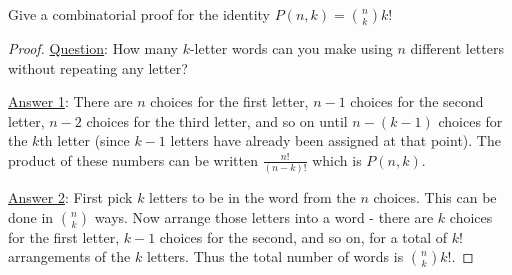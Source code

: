 \begin{questions}
\begin{answer}
	\end{answer}
	
	
	
\question Give a combinatorial proof for the identity $P(n,k) = {n \choose k}k!$
	
	\begin{answer}
		\begin{proof}
         \underline{Question}: How many $k$-letter words can you make using $n$ different letters without repeating any letter?
         
         \underline{Answer 1}: There are $n$ choices for the first letter, $n-1$ choices for the second letter, $n-2$ choices for the third letter, and so on until $n - (k-1)$ choices for the $k$th letter (since $k-1$ letters have already been assigned at that point).  The product of these numbers can be written $\frac{n!}{(n-k)!}$ which is $P(n,k)$.
         
         \underline{Answer 2}: First pick $k$ letters to be in the word from the $n$ choices.  This can be done in ${n \choose k}$ ways.  Now arrange those letters into a word - there are $k$ choices for the first letter, $k-1$ choices for the second, and so on, for a total of $k!$ arrangements of the $k$ letters.  Thus the total number of words is ${n \choose k}k!$.
        \end{proof}
	\end{answer}
	
	
	
	
	

\end{questions}
